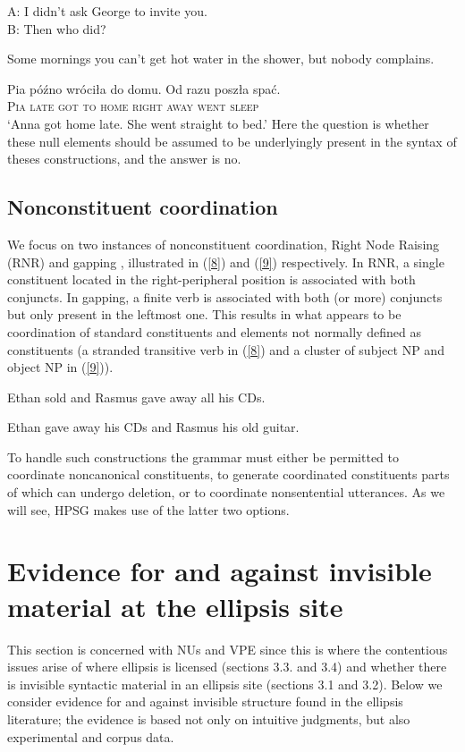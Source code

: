 \documentclass[output=paper
                ,modfonts
                ,nonflat
	        ,collection
	        ,collectionchapter
	        ,collectiontoclongg
 	        ,biblatex
                ,babelshorthands
                ,newtxmath
                ,draftmode
                ,colorlinks, citecolor=brown
]{./langsci/langscibook}
\begin{document}
{\ea A: I didn't ask George to invite you.\\B: Then who did?\label{5}\z

\ea Some mornings you can't get hot water in the shower, but nobody complains. \label{6} \z

\ea
\gll Pia p\'{o}\'{z}no wr\'{o}ci\l a do domu. {Od razu} posz\l a spa\'{c}.\\
\textsc{Pia} \textsc{late} \textsc{got} \textsc{to} \textsc{home} \textsc{right away} \textsc{went} \textsc{sleep}\\
\glt `Anna got home late. She went straight to bed.'
\label{7}
\z
Here the question is whether these null elements should be assumed to be underlyingly present in the syntax of theses constructions, and the answer is no.

\subsection{Nonconstituent coordination}

We focus on two instances of nonconstituent coordination, Right Node Raising (RNR) and gapping \citep{Ross1969}, illustrated in (\ref{8}) and (\ref{9}) respectively. In RNR, a single constituent located in the right-peripheral position is associated with both conjuncts. In gapping, a finite verb is associated with both (or more) conjuncts but only present in the leftmost one. This results in what appears to be coordination of standard constituents and elements not normally defined as constituents (a stranded transitive verb in (\ref{8}) and a cluster of subject NP and object NP in (\ref{9})).

\ea Ethan sold and Rasmus gave away all his CDs. \label{8}\z

\ea Ethan gave away his CDs and Rasmus his old guitar. \label{9}\z

To handle such constructions the grammar must either be permitted to coordinate noncanonical constituents, to generate coordinated constituents parts of which can undergo deletion, or to coordinate nonsentential utterances. As we will see, HPSG makes use of the latter two options.

\section{Evidence for and against invisible material at the ellipsis site}
\label{sec-evidence-for-invisible-material}

This section is concerned with NUs and VPE since this is where the contentious issues arise of where ellipsis is licensed (sections 3.3. and 3.4) and whether there is invisible syntactic material in an ellipsis site (sections 3.1 and 3.2). Below we consider evidence for and against invisible structure found in the ellipsis literature; the evidence is based not only on intuitive judgments, but also experimental and corpus data.

}
\end{document}
